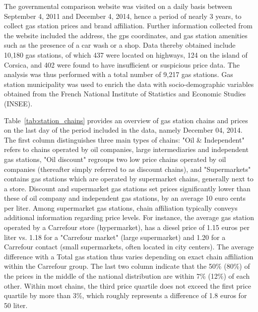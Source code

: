 \documentclass[english]{article}
\begin{document}
The governmental comparison website was visited on a daily basis between September 4, 2011 and December 4, 2014, hence a period of nearly 3 years, to collect gas station prices and brand affiliation. Further information collected from the website included the address, the gps coordinates, and gas station amenities such as the presence of a car wash or a shop. Data thereby obtained include 10,180 gas stations, of which 437 were located on highways, 124 on the island of Corsica, and 402 were found to have insufficient or suspicious price data. The analysis was thus performed with a total number of 9,217 gas stations. Gas station municipality was used to enrich the data with socio-demographic variables obtained from the French National Institute of Statistics and Economic Studies (INSEE).

Table~\ref{tab:station_chains} provides an overview of gas station chains and prices on the last day of the period included in the data, namely December 04, 2014. The first column distinguishes three main types of chains: "Oil \& Independent" refers to chains operated by oil companies, large intermediaries and independent gas stations, "Oil discount" regroups two low price chains operated by oil companies (thereafter simply referred to as discount chains), and "Supermarkets" contains gas stations which are operated by supermarket chains, generally next to a store. Discount and supermarket gas stations set prices significantly lower than these of oil company and independent gas stations, by an average 10 euro cents per liter. Among supermarket gas stations, chain affiliation typically conveys additional information regarding price levels. For instance, the average gas station operated by a Carrefour store (hypermarket), has a diesel price of 1.15 euros per liter vs. 1.18 for a "Carrefour market" (large supermarket) and 1.20 for a Carrefour contact (small supermarkets, often located in city centers). The average difference with a Total gas station thus varies depending on exact chain affiliation within the Carrefour group. The last two column indicate that the 50\% (80\%) of the prices in the middle of the national distribution are within 7\% (12\%) of each other. Within most chains, the third price quartile does not exceed the first price quartile by more than 3\%, which roughly represents a difference of 1.8 euros for 50 liter.
\end{document}

